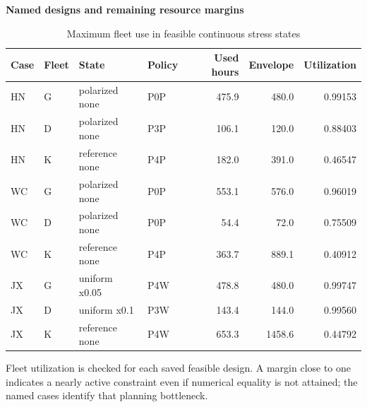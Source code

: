 \begin{table}[htbp]\centering
\caption{Maximum fleet use in feasible continuous stress states}\label{tab:round2_fleet}
\begin{minipage}{.95\textwidth}\fontsize{8}{10}\selectfont{}\setlength{\tabcolsep}{2pt}\renewcommand{\arraystretch}{1.08}
\par\noindent\textbf{Named designs and remaining resource margins}\par\smallskip
\begin{tabular*}{\linewidth}{@{\extracolsep{\fill}}ll>{\raggedright\arraybackslash}p{.27\linewidth}lrrr@{}}\toprule
Case & Fleet & State & Policy & Used hours & Envelope & Utilization \\
\midrule
HN & G & polarized none & P0P & 475.9 & 480.0 & 0.99153 \\
HN & D & polarized none & P3P & 106.1 & 120.0 & 0.88403 \\
HN & K & reference none & P4P & 182.0 & 391.0 & 0.46547 \\
WC & G & polarized none & P0P & 553.1 & 576.0 & 0.96019 \\
WC & D & polarized none & P0P & 54.4 & 72.0 & 0.75509 \\
WC & K & reference none & P4P & 363.7 & 889.1 & 0.40912 \\
JX & G & uniform x0.05 & P4W & 478.8 & 480.0 & 0.99747 \\
JX & D & uniform x0.1 & P3W & 143.4 & 144.0 & 0.99560 \\
JX & K & reference none & P4W & 653.3 & 1458.6 & 0.44792 \\
\bottomrule\end{tabular*}\par\medskip
\par\noindent\fontsize{8}{9.5}\selectfont Fleet utilization is checked for each saved feasible design. A margin close to one indicates a nearly active constraint even if numerical equality is not attained; the named cases identify that planning bottleneck.
\end{minipage}\end{table}

